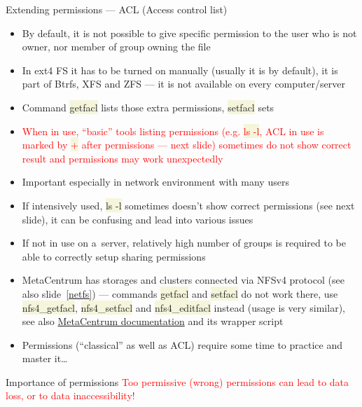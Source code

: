 \documentclass[compress, xelatex, 11pt, xcolor=svgnames, aspectratio=169, url={hyphens, lowtilde}]{beamer}
\renewcommand{\texttt}[1]{\colorbox{Beige}{{\ttfamily #1}}}
\renewcommand{\alert}[1]{\textcolor{red}{#1}}
\begin{document}
\begin{frame}[allowframebreaks]{Extending permissions --- ACL (Access control list)}
	\label{acl}
	\begin{itemize}
		\item By default, it is not possible to give specific permission to the user who is not owner, nor member of group owning the file
		\item In ext4 FS it has to be turned on manually (usually it is by default), it is part of Btrfs, XFS and ZFS --- it is not available on every computer/server
		\item Command \texttt{getfacl} lists those extra permissions, \texttt{setfacl} sets
		\item \alert{When in use, \enquote{basic} tools listing permissions (e.g. \texttt{ls -l}, ACL in use is marked by \texttt{+} after permissions --- next slide) sometimes do not show correct result and permissions may work unexpectedly}
		\item Important especially in network environment with many users
		\item If intensively used, \texttt{ls -l} sometimes doesn't show correct permissions (see next slide), it can be confusing and lead into various issues
		\item If not in use on a~server, relatively high number of groups is required to be able to correctly setup sharing permissions
		\item MetaCentrum has storages and clusters connected via NFSv4 protocol (see also slide~\ref{netfs}) --- commands \texttt{getfacl} and \texttt{setfacl} do not work there, use \texttt{nfs4\_getfacl}, \texttt{nfs4\_setfacl} and \texttt{nfs4\_editfacl} instead (usage is very similar), see also \href{https://docs.metacentrum.cz/en/docs/data/data-sharing\#nfsv4-wrapper}{MetaCentrum documentation} and its wrapper script
		\item Permissions (\enquote{classical} as well as ACL) require some time to practice and master it\ldots
	\end{itemize}
	\begin{block}{Importance of permissions}
		\alert{Too permissive (wrong) permissions can lead to data loss, or to data inaccessibility!}
	\end{block}
\end{frame}
\end{document}
